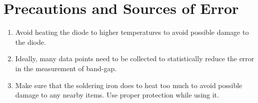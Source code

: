 \section{Precautions and Sources of Error}

    \begin{enumerate}
        \item Avoid heating the diode to higher temperatures to avoid possible damage to the diode.
        \item Ideally, many data points need to be collected to statistically reduce the error in the measurement of band-gap.
        \item Make sure that the soldering iron does to heat too much to avoid possible damage to any nearby items. Use proper protection while using it.
    \end{enumerate}